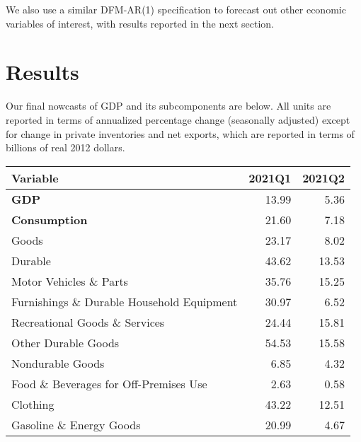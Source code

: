\documentclass[11pt, letterpaper]{article}\usepackage[]{graphicx}\usepackage[]{color}
\begin{document}
We also use a similar DFM-AR(1) specification to forecast out other economic variables of interest, with results reported in the next section.


\section{Results}
Our final nowcasts of GDP and its subcomponents are below. All units are reported in terms of annualized percentage change (seasonally adjusted) except for change in private inventories and net exports, which are reported in terms of billions of real 2012 dollars.
\begin{table}[H]
\centering
\begingroup\fontsize{10pt}{12pt}\selectfont
\begin{tabular}{lrr}
  \hline
Variable & 2021Q1 & 2021Q2 \\ 
  \hline
\hspace{0mm} \textbf{GDP} & 13.99 & 5.36 \\ 
  \hspace{0mm} \textbf{Consumption} & 21.60 & 7.18 \\ 
  \hspace{8mm}  Goods & 23.17 & 8.02 \\ 
  \hspace{16mm}  Durable & 43.62 & 13.53 \\ 
  \hspace{24mm}  Motor Vehicles \& Parts & 35.76 & 15.25 \\ 
  \hspace{24mm}  Furnishings \& Durable Household Equipment & 30.97 & 6.52 \\ 
  \hspace{24mm}  Recreational Goods \& Services & 24.44 & 15.81 \\ 
  \hspace{24mm}  Other Durable Goods & 54.53 & 15.58 \\ 
  \hspace{16mm}  Nondurable Goods & 6.85 & 4.32 \\ 
  \hspace{24mm}  Food \& Beverages for Off-Premises Use & 2.63 & 0.58 \\ 
  \hspace{24mm}  Clothing & 43.22 & 12.51 \\ 
  \hspace{24mm}  Gasoline \& Energy Goods & 20.99 & 4.67 \\ 

\end{tabular}
\end{table}
\end{document}
